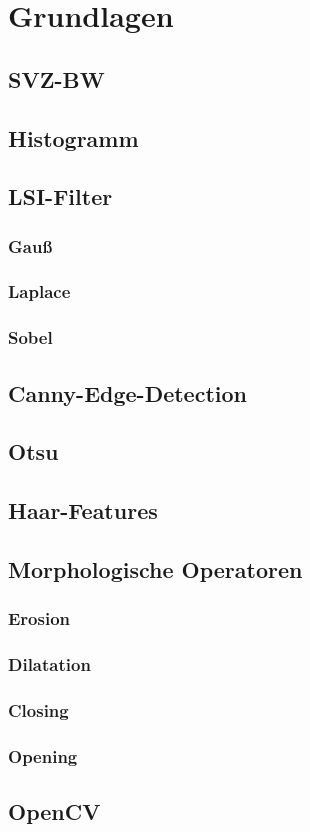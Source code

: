 \chapter{Grundlagen}

\section{SVZ-BW} %

\section{Histogramm} %

\section{LSI-Filter} %
\subsection{Gauß}
\subsection{Laplace}
\subsection{Sobel}

\section{Canny-Edge-Detection} %
\section{Otsu} %
\section{Haar-Features} %

\section{Morphologische Operatoren} %
\subsection{Erosion}
\subsection{Dilatation}
\subsection{Closing}
\subsection{Opening}

\section{OpenCV} %
